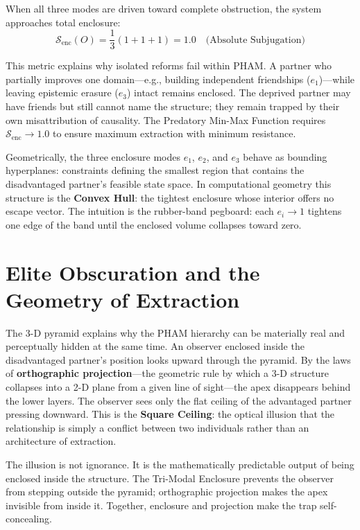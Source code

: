 \documentclass[12pt,openany]{book}
\numberwithin{equation}{chapter}
\begin{document}
When all three modes are driven toward complete obstruction, the system
approaches total enclosure:
\begin{equation}\label{eq:enc2-total-enclosure}
\mathcal{S}_{\text{enc}}(O) = \frac{1}{3}(1+1+1) = 1.0 \quad \text{(Absolute Subjugation)}
\end{equation}

This metric explains why isolated reforms fail within PHAM. A partner who partially
improves one domain---e.g., building independent friendships ($e_1$)---while leaving
epistemic erasure ($e_3$) intact remains enclosed. The deprived partner may have
friends but still cannot name the structure; they remain trapped by their own
misattribution of causality. The Predatory Min-Max Function requires
$\mathcal{S}_{\text{enc}} \rightarrow 1.0$ to ensure maximum extraction with
minimum resistance.

Geometrically, the three enclosure modes $e_1$, $e_2$, and $e_3$ behave as
bounding hyperplanes: constraints defining the smallest region that contains the
disadvantaged partner's feasible state space. In computational geometry this structure is
the \textbf{Convex Hull}: the tightest enclosure whose interior offers no escape
vector. The intuition is the rubber-band pegboard: each $e_i \to 1$ tightens one edge
of the band until the enclosed volume collapses toward zero.

\chapter{Elite Obscuration and the Geometry of Extraction}
\label{ch:elite_obscuration}

The 3-D pyramid explains why the PHAM hierarchy can be materially real and
perceptually hidden at the same time. An observer enclosed inside the disadvantaged
partner's position looks upward through the pyramid. By the laws of \textbf{orthographic projection}---the
geometric rule by which a 3-D structure collapses into a 2-D plane from a given
line of sight---the apex disappears behind the lower layers. The observer sees
only the flat ceiling of the advantaged partner pressing downward. This is the
\textbf{Square Ceiling}: the optical illusion that the relationship is simply a conflict
between two individuals rather than an architecture of extraction.

The illusion is not ignorance. It is the mathematically predictable output of
being enclosed inside the structure. The Tri-Modal Enclosure prevents the
observer from stepping outside the pyramid; orthographic projection makes the
apex invisible from inside it. Together, enclosure and projection make the trap
self-concealing.
\end{document}
